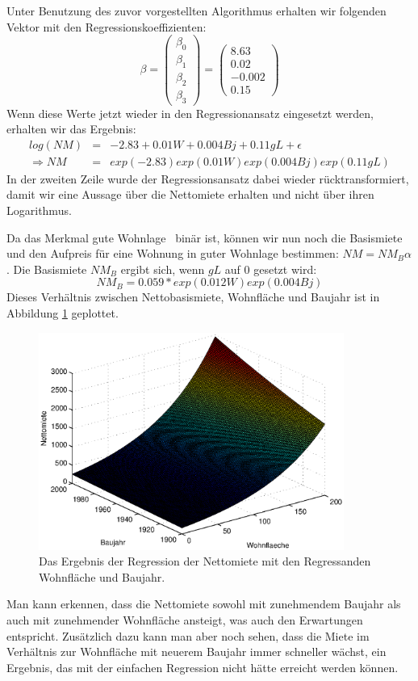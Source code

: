 Unter Benutzung des zuvor vorgestellten Algorithmus erhalten wir folgenden Vektor mit den Regressionskoeffizienten:
\begin{equation*}
  \beta = \begin{pmatrix} \beta_0 \\ \beta_1 \\ \beta_2 \\ \beta_3 \end{pmatrix} = \begin{pmatrix} 8.63 \\ 0.02 \\ -0.002 \\ 0.15 \end{pmatrix}
\end{equation*}
Wenn diese Werte jetzt wieder in den Regressionansatz eingesetzt werden, erhalten wir das Ergebnis:
\begin{eqnarray*}
  log(NM) & = & -2.83 + 0.01 W + 0.004 Bj + 0.11 gL + \epsilon\\
  \Rightarrow NM & = & exp(-2.83) exp(0.01 W) exp(0.004 Bj) exp(0.11 gL)
\end{eqnarray*}
In der zweiten Zeile wurde der Regressionsansatz dabei wieder rücktransformiert, damit wir eine Aussage über die Nettomiete erhalten und nicht über ihren Logarithmus.

Da das Merkmal \glqq gute Wohnlage\grqq~ binär ist, können wir nun noch die Basismiete und den Aufpreis für eine Wohnung in guter Wohnlage bestimmen: $NM = NM_B \alpha$.
Die Basismiete $NM_B$ ergibt sich, wenn $gL$ auf 0 gesetzt wird:
\begin{equation*}
  NM_B = 0.059 * exp(0.012 W) exp(0.004 Bj)
\end{equation*}
Dieses Verhältnis zwischen Nettobasismiete, Wohnfläche und Baujahr ist in Abbildung \ref{fig:3d_result} geplottet.
\begin{figure}[t]
  \centering
  \includegraphics[width=10cm]{figures/nm_wfl_bj_log_approach}
  \caption{Das Ergebnis der Regression der Nettomiete mit den Regressanden Wohnfläche und Baujahr.}
  \label{fig:3d_result}
\end{figure}
Man kann erkennen, dass die Nettomiete sowohl mit zunehmendem Baujahr als auch mit zunehmender Wohnfläche ansteigt, was auch den Erwartungen entspricht.
Zusätzlich dazu kann man aber noch sehen, dass die Miete im Verhältnis zur Wohnfläche mit neuerem Baujahr immer schneller wächst, ein Ergebnis, das mit der einfachen Regression nicht hätte erreicht werden können.


